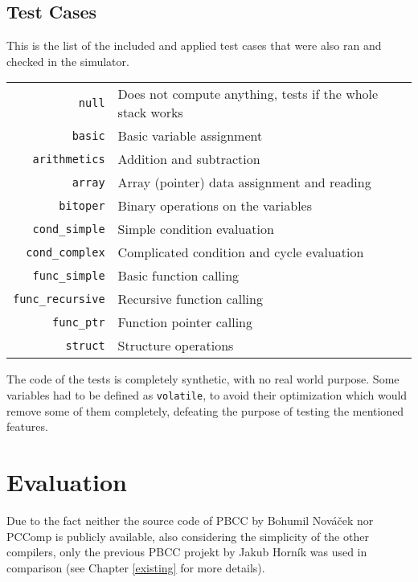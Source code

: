         \subsection{Test Cases}

            This is the list of the included and applied test cases that were also ran and checked in the simulator.

            \begin{center}
            \begin{tabular}{ r | l }
                \texttt{null} & Does not compute anything, tests if the whole stack works \\
                \texttt{basic} & Basic variable assignment \\
                \texttt{arithmetics} & Addition and subtraction \\
                \texttt{array} & Array (pointer) data assignment and reading \\
                \texttt{bitoper} & Binary operations on the variables \\
                \texttt{cond\_simple} & Simple condition evaluation \\
                \texttt{cond\_complex} & Complicated condition and cycle evaluation \\
                \texttt{func\_simple} & Basic function calling \\
                \texttt{func\_recursive} & Recursive function calling \\
                \texttt{func\_ptr} & Function pointer calling \\
                \texttt{struct} & Structure operations \\
            \end{tabular}
            \end{center}

            The code of the tests is completely synthetic, with no real world purpose. Some variables had to be defined as \texttt{volatile}, to avoid their optimization which would remove some of them completely, defeating the purpose of testing the mentioned features.

    \section{Evaluation}

    Due to the fact neither the source code of PBCC by Bohumil Nováček nor PCComp is publicly available, also considering the simplicity of the other compilers, only the previous PBCC projekt by Jakub Horník was used in comparison (see Chapter \ref{existing} for more details).

